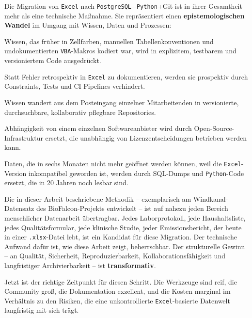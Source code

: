 ﻿\documentclass[12pt,a4paper]{report}
\theoremstyle{definition}
\theoremstyle{remark}
\newcommand{\excel}{\texttt{Excel}}
\newcommand{\vba}{\texttt{VBA}}
\newcommand{\pg}{\texttt{PostgreSQL}}
\newcommand{\py}{\texttt{Python}}
\newcommand{\code}[1]{\texttt{#1}}
\begin{document}
Die Migration von \excel{} nach \pg{}+\py{}+Git ist in ihrer Gesamtheit
mehr als eine technische Maßnahme.
Sie repräsentiert einen \textbf{epistemologischen Wandel} im Umgang
mit Wissen, Daten und Prozessen:

\begin{description}[leftmargin=2em, itemsep=6pt]
  \item[\textbf{Von implizit zu explizit:}]
        Wissen, das früher in Zellfarben, manuellen
        Tabellenkonventionen und undokumentierten \vba-Makros
        kodiert war, wird in explizitem, testbarem und
        versioniertem Code ausgedrückt.
  \item[\textbf{Von reaktiv zu prädiktiv:}]
        Statt Fehler retrospektiv in \excel{} zu dokumentieren,
        werden sie prospektiv durch Constraints, Tests und
        CI-Pipelines verhindert.
  \item[\textbf{Von silo-basiert zu kollaborativ:}]
        Wissen wandert aus dem Posteingang einzelner Mitarbeitenden
        in versionierte, durchsuchbare, kollaborativ pflegbare
        Repositories.
  \item[\textbf{Von proprietär zu souverän:}]
        Abhängigkeit von einem einzelnen Softwareanbieter wird durch
        Open-Source-Infrastruktur ersetzt, die unabhängig von
        Lizenzentscheidungen betrieben werden kann.
  \item[\textbf{Von ephemer zu archivierbar:}]
        Daten, die in sechs Monaten nicht mehr geöffnet werden können,
        weil die \excel-Version inkompatibel geworden ist, werden durch
        SQL-Dumps und \py-Code ersetzt, die in 20 Jahren noch lesbar sind.
\end{description}

Die in dieser Arbeit beschriebene Methodik -- exemplarisch am
Windkanal-Datensatz des BioFalcon-Projekts entwickelt -- ist auf
nahezu jeden Bereich menschlicher Datenarbeit übertragbar.
Jedes Laborprotokoll, jede Haushaltsliste, jedes Qualitätsformular,
jede klinische Studie, jeder Emissionsbericht, der heute in einer
\code{.xlsx}-Datei lebt, ist ein Kandidat für diese Migration.
Der technische Aufwand dafür ist, wie diese Arbeit zeigt, beherrschbar.
Der strukturelle Gewinn -- an Qualität, Sicherheit, Reproduzierbarkeit,
Kollaborationsfähigkeit und langfristiger Archivierbarkeit -- ist
\textbf{transformativ}.

\medskip

Jetzt ist der richtige Zeitpunkt für diesen Schritt.
Die Werkzeuge sind reif, die Community groß, die Dokumentation
exzellent, und die Kosten marginal im Verhältnis zu den Risiken,
die eine unkontrollierte \excel-basierte Datenwelt langfristig
mit sich trägt.
\end{document}
